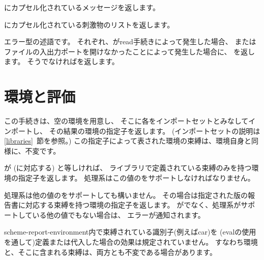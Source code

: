 \begin{entry}{%
}

にカプセル化されているメッセージを返します。

\end{entry}

\begin{entry}{%
}

にカプセル化されている刺激物のリストを返します。

\end{entry}

\begin{entry}{%
}

エラー型の述語です。
それぞれ、が{\cf read}手続きによって発生した場合、
またはファイルの入出力ポートを開けなかったことによって発生した場合に、
\schtrue{}を返します。
そうでなければ\schfalse{}を返します。

\end{entry}

\section{環境と評価}

\begin{entry}{%
}
\label{environments}

この手続きは、空の環境を用意し、
そこに各をインポートセットとみなしてインポートし、
その結果の環境の指定子を返します。
(インポートセットの説明は\ref{libraries}~節を参照。)
この指定子によって表された環境の束縛は、環境自身と同様に、不変です。

\end{entry}

\begin{entry}{%
}

が{} (\rfivers に対応する) と等しければ、
\rfivers ライブラリで定義されている束縛のみを持つ環境の指定子を返します。
処理系はこの値のをサポートしなければなりません。

処理系は他の値のをサポートしても構いません。
その場合は指定された版の報告書に対応する束縛を持つ環境の指定子を返します。
が{}でなく、処理系がサポートしている他の値でもない場合は、
エラーが通知されます。

{\cf scheme-report-environment}内で束縛されている識別子(例えば{\cf car})を
({\cf eval}の使用を通して)定義または代入した場合の効果は規定されていません。
すなわち環境と、そこに含まれる束縛は、両方とも不変である場合があります。

\end{entry}

